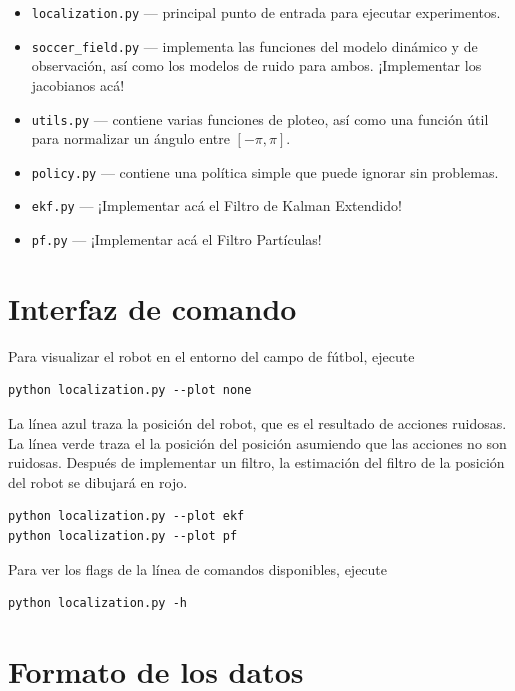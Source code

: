 \documentclass[tp]{lcc}
\begin{document}
	\begin{itemize}
		\item \lstinline[style=bash]{localization.py} --- principal punto de entrada para ejecutar experimentos.
		\item \lstinline[style=bash]{soccer_field.py} --- implementa las funciones del modelo dinámico y de observación, así como los modelos de ruido para ambos. ¡Implementar los jacobianos acá!
		\item \lstinline[style=bash]{utils.py} --- contiene varias funciones de ploteo, así como una función útil para normalizar un ángulo entre $[-\pi, \pi]$.
		\item \lstinline[style=bash]{policy.py} --- contiene una política simple que puede ignorar sin problemas.
		\item \lstinline[style=bash]{ekf.py} --- ¡Implementar acá el Filtro de Kalman Extendido!
		\item \lstinline[style=bash]{pf.py} --- ¡Implementar acá el Filtro Partículas!
	\end{itemize}

	\section{Interfaz de comando}

	Para visualizar el robot en el entorno del campo de fútbol, ejecute

\begin{lstlisting}[style=bash] 
python localization.py --plot none
\end{lstlisting}


	La línea azul traza la posición del robot, que es el resultado de acciones ruidosas. La línea verde traza el la posición del posición asumiendo que las acciones no son ruidosas. Después de implementar un filtro, la estimación del filtro de la posición del robot se dibujará en rojo.
	
	
\begin{lstlisting}[style=bash] 
python localization.py --plot ekf
python localization.py --plot pf
\end{lstlisting}

	Para ver los flags de la línea de comandos disponibles, ejecute

\begin{lstlisting}[style=bash] 
python localization.py -h
\end{lstlisting}

	\section{Formato de los datos}
\end{document}
